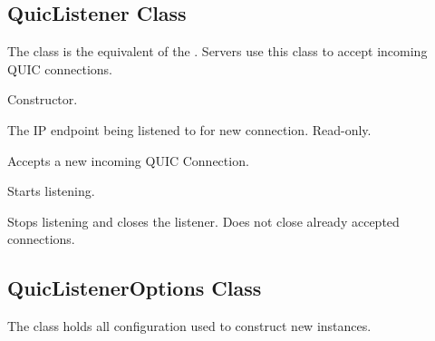 \subsection{QuicListener Class}

The  class is the equivalent of the . Servers use this
class to accept incoming QUIC connections.

\begin{description}

     Constructor.

     The IP endpoint being listened to for new connection. Read-only.

    Accepts a new incoming QUIC Connection.

     Starts listening.

     Stops listening and closes the listener. Does not close already accepted connections.

\end{description}

\subsection{QuicListenerOptions Class}

The  class holds all configuration used to construct new  instances.


